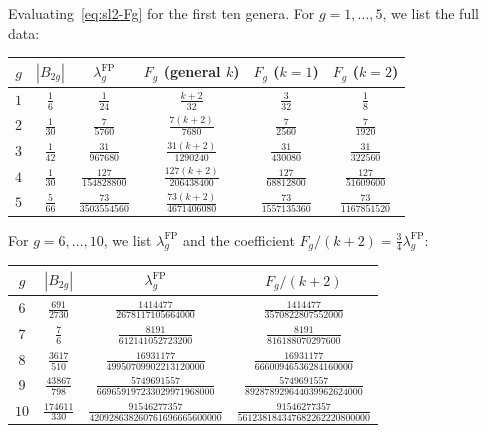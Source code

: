 \begin{computation}[Explicit values through \texorpdfstring{$g = 10$}{g = 10}]\label{comp:sl2-genus-table}

Evaluating~\eqref{eq:sl2-Fg} for the first ten genera.
For $g = 1, \ldots, 5$, we list the full data:

\medskip
\begin{center}
\renewcommand{\arraystretch}{1.3}
\begin{tabular}{cccccc}
\toprule
$g$ & $|B_{2g}|$ & $\lambda_g^{\mathrm{FP}}$ & $F_g$ (general $k$) & $F_g$ ($k=1$) & $F_g$ ($k=2$) \\
\midrule
$1$ & $\frac{1}{6}$ & $\frac{1}{24}$ & $\frac{k+2}{32}$ & $\frac{3}{32}$ & $\frac{1}{8}$ \\[6pt]
$2$ & $\frac{1}{30}$ & $\frac{7}{5760}$ & $\frac{7(k+2)}{7680}$ & $\frac{7}{2560}$ & $\frac{7}{1920}$ \\[6pt]
$3$ & $\frac{1}{42}$ & $\frac{31}{967680}$ & $\frac{31(k+2)}{1290240}$ & $\frac{31}{430080}$ & $\frac{31}{322560}$ \\[6pt]
$4$ & $\frac{1}{30}$ & $\frac{127}{154828800}$ & $\frac{127(k+2)}{206438400}$ & $\frac{127}{68812800}$ & $\frac{127}{51609600}$ \\[6pt]
$5$ & $\frac{5}{66}$ & $\frac{73}{3503554560}$ & $\frac{73(k+2)}{4671406080}$ & $\frac{73}{1557135360}$ & $\frac{73}{1167851520}$ \\[4pt]
\bottomrule
\end{tabular}
\end{center}

\medskip
\noindent
For $g = 6, \ldots, 10$, we list $\lambda_g^{\mathrm{FP}}$ and the coefficient
$F_g/(k{+}2) = \frac{3}{4}\lambda_g^{\mathrm{FP}}$:

\medskip
\begin{center}
\renewcommand{\arraystretch}{1.3}
\begin{tabular}{cccc}
\toprule
$g$ & $|B_{2g}|$ & $\lambda_g^{\mathrm{FP}}$ & $F_g/(k{+}2)$ \\
\midrule
$6$ & $\frac{691}{2730}$ & $\frac{1414477}{2678117105664000}$ & $\frac{1414477}{3570822807552000}$ \\[6pt]
$7$ & $\frac{7}{6}$ & $\frac{8191}{612141052723200}$ & $\frac{8191}{816188070297600}$ \\[6pt]
$8$ & $\frac{3617}{510}$ & $\frac{16931177}{49950709902213120000}$ & $\frac{16931177}{66600946536284160000}$ \\[6pt]
$9$ & $\frac{43867}{798}$ & $\frac{5749691557}{669659197233029971968000}$ & $\frac{5749691557}{892878929644039962624000}$ \\[6pt]
$10$ & $\frac{174611}{330}$ & $\frac{91546277357}{420928638260761696665600000}$ & $\frac{91546277357}{561238184347682262220800000}$ \\[4pt]
\bottomrule
\end{tabular}
\end{center}


\end{computation}
